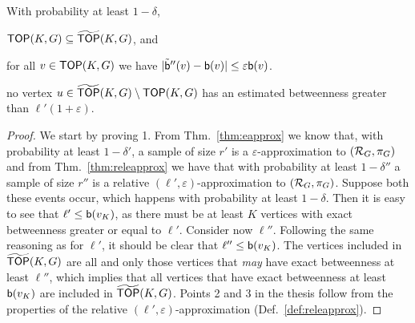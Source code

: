 \begin{lemma}
  With probability at least $1-\delta$, 
  \begin{enumerate*}
    \item $\mathsf{TOP}(K,G)\subseteq \widetilde{\mathsf{TOP}}(K,G)$, and
    \item for all $v\in\mathsf{TOP}(K,G)$ we have
      $|\tilde{\mathsf{b}}''(v)-\mathsf{b}(v)|\le\varepsilon\mathsf{b}(v)$.
    \item no vertex $u\in\widetilde{\mathsf{TOP}}(K,G)\setminus\mathsf{TOP}(K,G)$ has an estimated
      betweenness greater than $\ell'(1+\varepsilon)$.
  \end{enumerate*}
\end{lemma}
\begin{proof}
  We start by proving 1. From Thm.~\ref{thm:eapprox} we know that, with probability at least
  $1-\delta'$, a sample of size $r'$ is a $\varepsilon$-approximation to
  $(\mathcal{R}_G,\pi_G)$ and from Thm.~\ref{thm:releapprox} we have that with
  probability at least $1-\delta''$ a sample of size $r''$ is a relative
  $(\ell',\varepsilon)$-approximation to $(\mathcal{R}_G,\pi_G)$. Suppose both these
  events occur, which happens with probability at least $1-\delta$. Then it is
  easy to see that $\ell'\le\mathsf{b}(v_K)$, as there must be at least $K$ vertices
  with exact betweenness greater or equal to $\ell'$.  Consider now $\ell''$.
  Following the same reasoning as for $\ell'$, it should be clear that
  $\ell''\le\mathsf{b}(v_K)$. The vertices included in $\widetilde{\mathsf{TOP}}(K,G)$ are all and
  only those vertices that \emph{may} have exact betweenness at least $\ell''$,
  which implies that all vertices that have exact betweenness at least
  $\mathsf{b}(v_K)$ are included in $\widetilde{\mathsf{TOP}}(K,G)$. 
  Points 2 and 3 in the thesis follow from the properties of the relative
  $(\ell',\varepsilon)$-approximation (Def.~\ref{def:releapprox}).
\end{proof}

